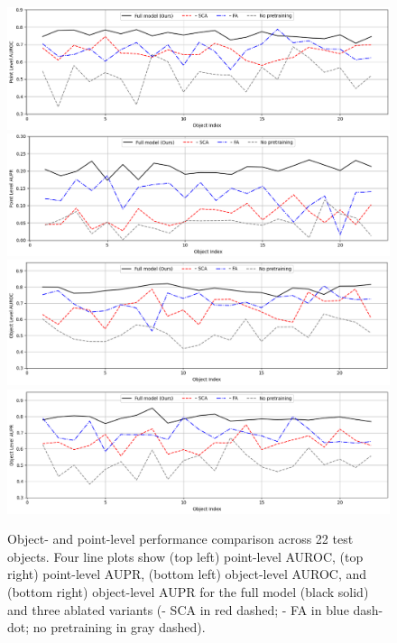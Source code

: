 \begin{figure}[h!]
  \centering
    \includegraphics[width=0.9\linewidth]{figs/line1}
    \includegraphics[width=0.9\linewidth]{figs/line2}
    \includegraphics[width=0.9\linewidth]{figs/line3}
    \includegraphics[width=0.9\linewidth]{figs/line4}
  \caption{Object- and point-level performance comparison across 22 test objects. Four line plots show (top left) point-level AUROC, (top right) point-level AUPR, (bottom left) object-level AUROC, and (bottom right) object-level AUPR for the full model (black solid) and three ablated variants (- SCA in red dashed; - FA in blue dash-dot; no pretraining in gray dashed).}
  \label{fig:ablation}
\end{figure}

